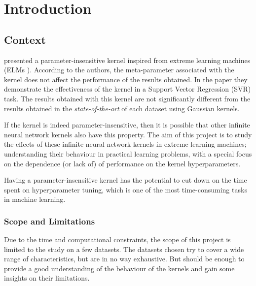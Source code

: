 \chapter{Introduction}
\label{sec:introduction}

\section{Context}


\Textcite{frenayParameterinsensitiveKernelExtreme2011} presented a
parameter-insensitive kernel inspired from extreme learning machines (ELMs
\cite{huangExtremeLearningMachine2006}). According to the authors, the
meta-parameter associated with the kernel does not affect the performance of the
results obtained. In the paper they demonstrate the effectiveness of the kernel
in a Support Vector Regression (SVR) task. The results obtained with this kernel
are not significantly different from the results obtained in the
\emph{state-of-the-art} of each dataset using Gaussian kernels.

If the kernel is indeed parameter-insensitive, then it is possible that other
infinite neural network kernels also have this property. The aim of this project
is to study the effects of these infinite neural network kernels in extreme
learning machines; understanding their behaviour in practical learning problems,
with a special focus on the dependence (or lack of) of performance on the kernel
hyperparameters.

Having a parameter-insensitive kernel has the potential to cut down on the time
spent on hyperparameter tuning, which is one of the most time-consuming tasks in
machine learning.

\subsection{Scope and Limitations}%
\label{sub:scope_and_limitations}

Due to the time and computational constraints, the scope of this project is
limited to the study on a few datasets. The datasets chosen try to cover a wide
range of characteristics, but are in no way exhaustive. But should be enough to
provide a good understanding of the behaviour of the kernels and gain some
insights on their limitations.


